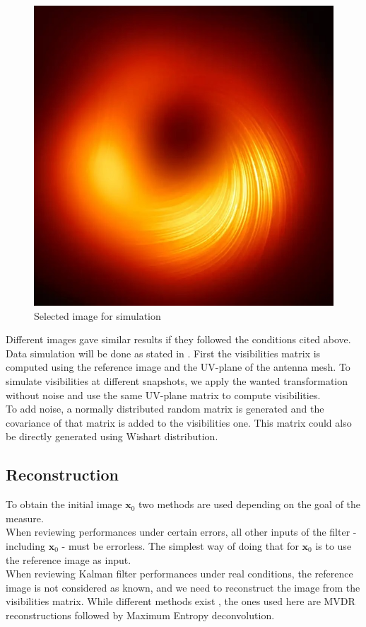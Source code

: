 \documentclass[titlepage,11pt]{article}
\newcommand{\x}{\boldsymbol{x}}
\begin{document}
	\begin{figure}[H]
		\centering
		\includegraphics[width=0.5\linewidth]{src/bh_square}
		\caption{Selected image for simulation}
		\label{fig:bhsquare}
	\end{figure}
	
	Different images gave similar results if they followed the conditions cited above.\\
	
	Data simulation will be done as stated in \cite{TER}. First the visibilities matrix is computed using the reference image and the UV-plane of the antenna mesh. To simulate visibilities at different snapshots, we apply the wanted transformation without noise and use the same UV-plane matrix to compute visibilities.\\
	
	To add noise, a normally distributed random matrix is generated and the covariance of that matrix is added to the visibilities one. This matrix could also be directly generated using Wishart distribution. \\ 
	
	\subsection{Reconstruction}
	
	To obtain the initial image $\x_0$ two methods are used depending on the goal of the measure. \\
	
	When reviewing performances under certain errors, all other inputs of the filter - including $\x_0$ - must be errorless. The simplest way of doing that for $\x_0$ is to use the reference image as input. \\
	
	When reviewing Kalman filter performances under real conditions, the reference image is not considered as known, and we need to reconstruct the image from the visibilities matrix. While different methods exist \cite{TER}, the ones used here are MVDR reconstructions followed by Maximum Entropy deconvolution.
	
\end{document}
